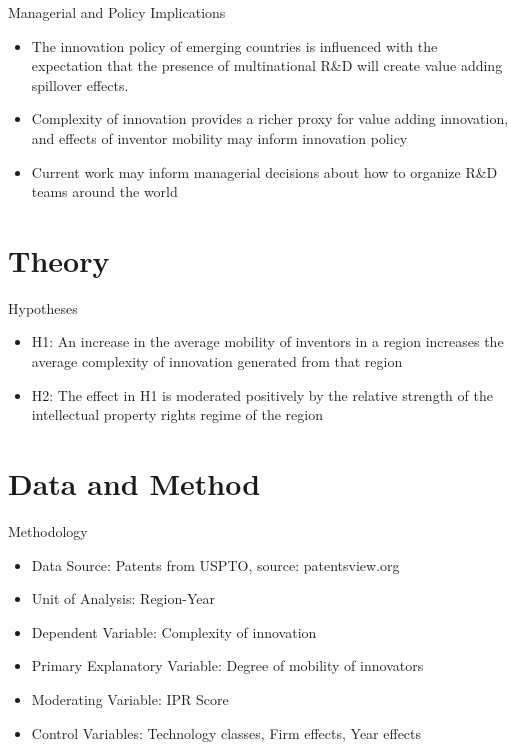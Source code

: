 \documentclass{beamer}
\begin{document}
\begin{frame}{Managerial and Policy Implications}{}
\begin{itemize}
\item{The innovation policy of emerging countries is influenced with the expectation that the presence of multinational R\&D will create value adding spillover effects.}
\item{Complexity of innovation provides a richer proxy for value adding innovation, and effects of inventor mobility may inform innovation policy}
\item{Current work may inform managerial decisions about how to organize R\&D teams around the world}
\end{itemize}
\end{frame}

\section{Theory}
\begin{frame}{Hypotheses}{}
\begin{itemize}
\item{H1: An increase in the average mobility of inventors in a region increases the average complexity of  innovation generated from that region}
\item{H2: The effect in H1 is moderated positively by the relative strength of the intellectual property rights regime of the region}
\end{itemize}
\end{frame}


\section{Data and Method}
\begin{frame}{Methodology}{}
\begin{itemize}
\item{Data Source: Patents from USPTO, source: patentsview.org}
\item{Unit of Analysis: Region-Year}
\item{Dependent Variable: Complexity of innovation}
\item{Primary Explanatory Variable: Degree of mobility of innovators}
\item{Moderating Variable: IPR Score }
\item{Control Variables: Technology classes, Firm effects, Year effects}
\end{itemize}
\end{frame}
\end{document}
